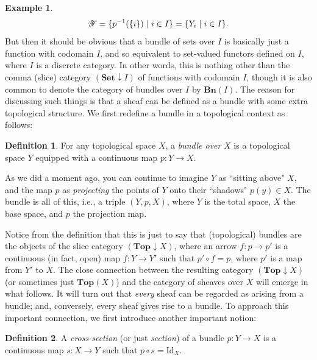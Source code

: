 \documentclass[11pt]{book}
\theoremstyle{definition}
\newtheorem{example}{Example}[section]
\theoremstyle{definition}
\newtheorem{definition}{Definition}[section]
\theoremstyle{definition}
\theoremstyle{theorem}
\theoremstyle{definition}
\begin{document}
\begin{example}
\begin{equation*}
	\mathscr{Y} = \{p^{-1}(\{i\}) \hspace*{0.3em}| \hspace*{0.3em} i \in I \} = \{Y_i \hspace*{0.3em}| \hspace*{0.3em}i \in I \} .
\end{equation*}
	But then it should be obvious that a bundle of sets over $I$ is basically just a function with codomain $I$, and so equivalent to set-valued functors defined on $I$, where $I$ is a discrete category. In other words, this is nothing other than the comma (slice) category $(\textbf{Set}  \downarrow I)$ of functions with codomain $I$, though it is also common to denote the category of bundles over $I$ by $\textbf{Bn}(I)$. The reason for discussing such things is that a sheaf can be defined as a bundle with some extra topological structure. We first redefine a bundle in a topological context as follows: 
	\begin{definition} For any topological space $X$, a \textit{bundle over} $X$ is a topological space $Y$ equipped with a continuous map $p: Y \rightarrow X$. 
	\end{definition} \noindent 
As we did a moment ago, you can continue to imagine $Y$ as ``sitting above" $X$, and the map $p$ as \textit{projecting} the points of $Y$ onto their ``shadows" $p(y) \in X$. The bundle is all of this, i.e., a triple $(Y, p, X)$, where $Y$ is the total space, $X$ the base space, and $p$ the projection map. \par 
Notice from the definition that this is just to say that (topological) bundles are the objects of the slice category $(\textbf{Top} \downarrow X)$, where an arrow $f: p \rightarrow p'$ is a continuous (in fact, open) map $f: Y \rightarrow Y'$ such that $p' \circ f = p$, where $p'$ is a map from $Y'$ to $X$. The close connection between the resulting category $(\textbf{Top} \downarrow X)$ (or sometimes just $\textbf{Top}(X)$) and the category of sheaves over $X$ will emerge in what follows. It will turn out that \textit{every} sheaf can be regarded as arising from a bundle; and, conversely, every sheaf gives rise to a bundle. To approach this important connection, we first introduce another important notion: 
	\begin{definition}
		A \textit{cross-section} (or just \textit{section}) of a bundle $p: Y \rightarrow X$ is a continuous map $s: X \rightarrow Y$ such that $p \circ s = \text{Id}_X$. 

\end{definition}
\end{example}
\end{document}
